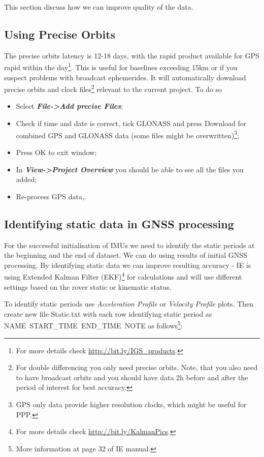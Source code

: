 \documentclass[11pt,fleqn]{book} %
\newcommand{\moreInfo}[1]{\footnote{For more details check \url{#1}.}}
\begin{document}
This section discuss how we can improve quality of the data.


\subsection{Using Precise Orbits}

The precise orbits latency is 12-18 days, with the rapid product available for GPS rapid within the day\moreInfo{http://bit.ly/IGS_products}. This is useful for baselines exceeding 15km or if you suspect problems with broadcast ephemerides. It will automatically download precise orbits and clock files\footnote{For double differencing you only need precise orbits. Note, that you also need to have broadcast orbits and you should have data 2h before and after the period of interest for best accuracy.} relevant to the current project. To do so 

\begin{itemize}
	\item Select \textbf{\emph{File->Add precise Files}};
	\item Check if time and date is correct, tick GLONASS and press Download for combined GPS and GLONASS data (some files might be overwritten)\footnote{GPS only data provide higher resolution clocks, which might be useful for PPP.};
	\item Press OK to exit window;
	\item In \textbf{\emph{View->Project Overview}} you should be able to see all the files you added;
	\item Re-process GPS data,.
\end{itemize}


\subsection{Identifying static data in GNSS processing\label{sec:Static-periods}}

For the successful initialisation of IMUs we need to identify the static periods at the beginning and the end of dataset. We can do using results of initial GNSS processing. By identifying static data we can improve resulting accuracy - IE is using Extended Kalman Filter (EKF)\moreInfo{http://bit.ly/KalmanPics} for calculations and will use different settings based on the rover static or kinematic status.

To identify static periods use \emph{Acceleration Profile} or \emph{Velocity Profile} plots. Then create new file Static.txt with each row identifying static period as NAME~START\_TIME~END\_TIME~NOTE as follows\footnote{More information at page 32 of IE manual.}:
\end{document}
